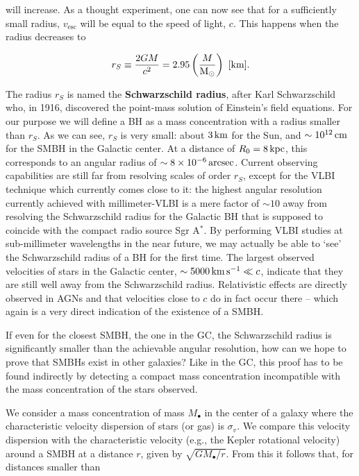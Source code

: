 \documentclass[a4paper,10pt]{article}
\begin{document}
{\noindent}will increase. As a thought experiment, one can now see that for a sufficiently small radius, $v_\mathrm{esc}$ will be equal to the speed of light, $c$. This happens when the radius decreases to

\begin{align*}
    r_S \equiv \frac{2GM}{c^2} = 2.95\left(\frac{M}{{\rm M_\odot}}\right) ~ [{\rm km}].
\end{align*}

{\noindent}The radius $r_S$ is named the \textbf{Schwarzschild radius}, after Karl Schwarzschild who, in 1916, discovered the point-mass solution of Einstein's field equations. For our purpose we will define a BH as a mass concentration with a radius smaller than $r_S$. As we can see, $r_S$ is very small: about $3\,{\rm km}$ for the Sun, and $\sim10^{12}\,{\rm cm}$ for the SMBH in the Galactic center. At a distance of $R_0=8\,{\rm kpc}$, this corresponds to an angular radius of $\sim8\times10^{-6}\,{\rm arcsec}$. Current observing capabilities are still far from resolving scales of order $r_S$, except for the VLBI technique which currently comes close to it: the highest angular resolution currently achieved with millimeter-VLBI is a mere factor of $\sim10$ away from resolving the Schwarzschild radius for the Galactic BH that is supposed to coincide with the compact radio source Sgr A$^*$. By performing VLBI studies at sub-millimeter wavelengths in the near future, we may actually be able to `see' the Schwarzschild radius of a BH for the first time. The largest observed velocities of stars in the Galactic center,   $\sim5000\,{\rm km\,s^{-1}}\ll c$, indicate that they are still well away from the Schwarzschild radius. Relativistic effects are directly observed in AGNs and that velocities close to $c$ do in fact occur there -- which again is a very direct indication of the existence of a SMBH.

{\noindent}If even for the closest SMBH, the one in the GC, the Schwarzschild radius is significantly smaller than the achievable angular resolution, how can we hope to prove that SMBHs exist in other galaxies? Like in the GC, this proof has to be found indirectly by detecting a compact mass concentration incompatible with the mass concentration of the stars observed.

{\noindent}We consider a mass concentration of mass $M_\bullet$ in the center of a galaxy where the characteristic velocity dispersion of stars (or gas) is $\sigma_v$. We compare this velocity dispersion with the characteristic velocity (e.g., the Kepler rotational velocity) around a SMBH at a distance $r$, given by $\sqrt{GM_\bullet/r}$. From this it follows that, for distances smaller than
\end{document}
